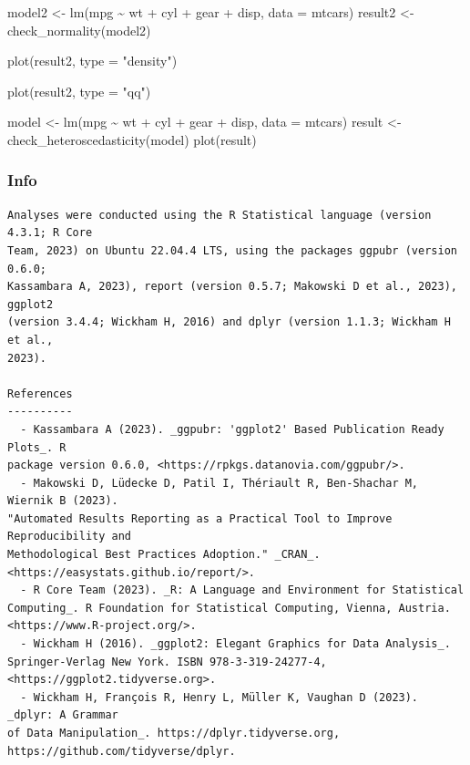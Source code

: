 \documentclass[
  10pt]{article}
\newenvironment{Shaded}{\begin{snugshade}}{\end{snugshade}}
\newcommand{\AttributeTok}[1]{\textcolor[rgb]{0.40,0.45,0.13}{#1}}
\newcommand{\FunctionTok}[1]{\textcolor[rgb]{0.28,0.35,0.67}{#1}}
\newcommand{\NormalTok}[1]{\textcolor[rgb]{0.00,0.23,0.31}{#1}}
\newcommand{\OtherTok}[1]{\textcolor[rgb]{0.00,0.23,0.31}{#1}}
\newcommand{\SpecialCharTok}[1]{\textcolor[rgb]{0.37,0.37,0.37}{#1}}
\newcommand{\StringTok}[1]{\textcolor[rgb]{0.13,0.47,0.30}{#1}}
\begin{document}
\begin{Shaded}
\begin{Highlighting}[]
\NormalTok{model2 }\OtherTok{\textless{}{-}} \FunctionTok{lm}\NormalTok{(mpg }\SpecialCharTok{\textasciitilde{}}\NormalTok{ wt }\SpecialCharTok{+}\NormalTok{ cyl }\SpecialCharTok{+}\NormalTok{ gear }\SpecialCharTok{+}\NormalTok{ disp, }\AttributeTok{data =}\NormalTok{ mtcars)}
\NormalTok{result2 }\OtherTok{\textless{}{-}} \FunctionTok{check\_normality}\NormalTok{(model2)}

\FunctionTok{plot}\NormalTok{(result2, }\AttributeTok{type =} \StringTok{"density"}\NormalTok{)}

\FunctionTok{plot}\NormalTok{(result2, }\AttributeTok{type =} \StringTok{"qq"}\NormalTok{)}

\NormalTok{model }\OtherTok{\textless{}{-}} \FunctionTok{lm}\NormalTok{(mpg }\SpecialCharTok{\textasciitilde{}}\NormalTok{ wt }\SpecialCharTok{+}\NormalTok{ cyl }\SpecialCharTok{+}\NormalTok{ gear }\SpecialCharTok{+}\NormalTok{ disp, }\AttributeTok{data =}\NormalTok{ mtcars)}
\NormalTok{result }\OtherTok{\textless{}{-}} \FunctionTok{check\_heteroscedasticity}\NormalTok{(model)}
\FunctionTok{plot}\NormalTok{(result)}
\end{Highlighting}
\end{Shaded}

\subsubsection{Info}\label{info}

\begin{verbatim}
Analyses were conducted using the R Statistical language (version 4.3.1; R Core
Team, 2023) on Ubuntu 22.04.4 LTS, using the packages ggpubr (version 0.6.0;
Kassambara A, 2023), report (version 0.5.7; Makowski D et al., 2023), ggplot2
(version 3.4.4; Wickham H, 2016) and dplyr (version 1.1.3; Wickham H et al.,
2023).

References
----------
  - Kassambara A (2023). _ggpubr: 'ggplot2' Based Publication Ready Plots_. R
package version 0.6.0, <https://rpkgs.datanovia.com/ggpubr/>.
  - Makowski D, Lüdecke D, Patil I, Thériault R, Ben-Shachar M, Wiernik B (2023).
"Automated Results Reporting as a Practical Tool to Improve Reproducibility and
Methodological Best Practices Adoption." _CRAN_.
<https://easystats.github.io/report/>.
  - R Core Team (2023). _R: A Language and Environment for Statistical
Computing_. R Foundation for Statistical Computing, Vienna, Austria.
<https://www.R-project.org/>.
  - Wickham H (2016). _ggplot2: Elegant Graphics for Data Analysis_.
Springer-Verlag New York. ISBN 978-3-319-24277-4,
<https://ggplot2.tidyverse.org>.
  - Wickham H, François R, Henry L, Müller K, Vaughan D (2023). _dplyr: A Grammar
of Data Manipulation_. https://dplyr.tidyverse.org,
https://github.com/tidyverse/dplyr.
\end{verbatim}
\end{document}
